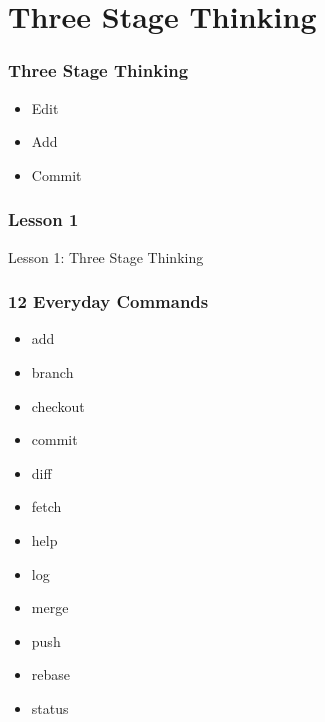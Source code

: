 \section[Section]{Three Stage Thinking}

\begin{frame}
\frametitle{Three Stage Thinking}
\begin{itemize}
    \setlength\itemsep{3em}
    \item Edit
    \item Add
    \item Commit
\end{itemize}
\end{frame}

\begin{frame}
\frametitle{Lesson 1}
\alert{Lesson 1}: Three Stage Thinking
\end{frame}

\begin{frame}
\frametitle{12 Everyday Commands}
\begin{multicols}{3}
    \begin{itemize}
        \setlength\itemsep{3em}
        \item \alert{add}
        \item branch
        \item checkout
        \item \alert{commit}
        \item \alert{diff}
        \item fetch
        \item \alert{help}
        \item \alert{log}
        \item merge
        \item push
        \item rebase
        \item \alert{status}
    \end{itemize}
\end{multicols}
\end{frame}
